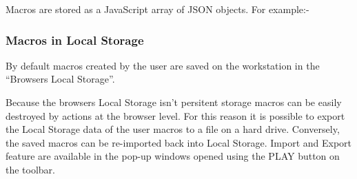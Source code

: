 \documentclass[letterpaper,10pt,english]{sphinxmanual}
\begin{document}
Macros are stored as a JavaScript array of JSON objects. For example:-

\begin{sphinxVerbatim}[commandchars=\\\{\}]
\PYG{p}{[}\PYG{p}{[}\PYG{p}{]}\PYG{p}{]}
\end{sphinxVerbatim}


\subsubsection{Macros in Local Storage}
\label{\detokenize{User_Guide:macros-in-local-storage}}
By default macros created by the user are saved on the workstation in the “Browsers Local Storage”.

Because the browsers Local Storage isn’t persitent storage macros can be easily destroyed by actions at the browser level. For this reason it is possible to
export the Local Storage data of the user macros to a file on a hard drive. Conversely, the saved macros can be re-imported back into Local Storage.
Import and Export feature are available in the pop-up windows opened using the PLAY button on the toolbar.
\end{document}
